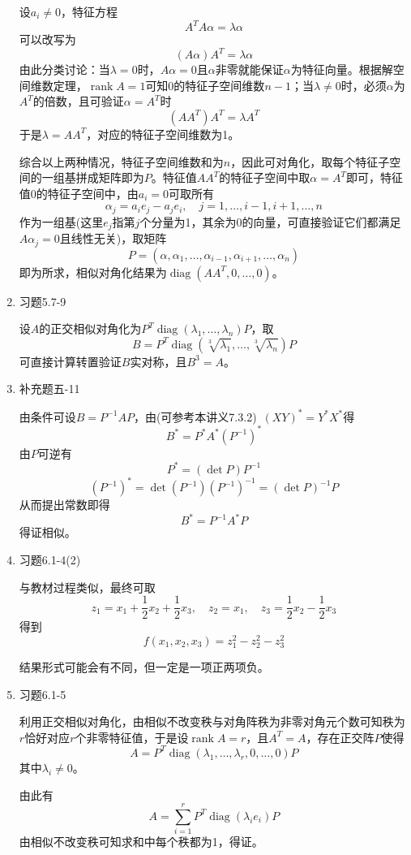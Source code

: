 \documentclass[a4paper,UTF8,fontset=windows]{ctexart}
\DeclareMathOperator{\diag}{diag}
\DeclareMathOperator{\rank}{rank}
\newcommand*{\note}{\noindent *}
\begin{document}
\begin{enumerate}
    设$a_i\ne0$，特征方程
    $$A^TA\alpha=\lambda\alpha$$
    可以改写为
    $$(A\alpha)A^T=\lambda\alpha$$
    由此分类讨论：当$\lambda=0$时，$A\alpha=0$且$\alpha$非零就能保证$\alpha$为特征向量。根据解空间维数定理，$\rank A=1$可知0的特征子空间维数$n-1$；当$\lambda\ne0$时，必须$\alpha$为$A^T$的倍数，且可验证$\alpha=A^T$时
    $$(AA^T)A^T=\lambda A^T$$
    于是$\lambda=AA^T$，对应的特征子空间维数为1。

    综合以上两种情况，特征子空间维数和为$n$，因此可对角化，取每个特征子空间的一组基拼成矩阵即为$P$。特征值$AA^T$的特征子空间中取$\alpha=A^T$即可，特征值0的特征子空间中，由$a_i=0$可取所有
    $$\alpha_j=a_ie_j-a_je_i,\quad j=1,\dots,i-1,i+1,\dots,n$$
    作为一组基(这里$e_j$指第$j$个分量为1，其余为0的向量，可直接验证它们都满足$A\alpha_j=0$且线性无关)，取矩阵
    $$P=(\alpha,\alpha_1,\dots,\alpha_{i-1},\alpha_{i+1},\dots,\alpha_n)$$
    即为所求，相似对角化结果为$\diag(AA^T,0,\dots,0)$。

    \item 习题5.7-9
    
    设$A$的正交相似对角化为$P^T\diag(\lambda_1,\dots,\lambda_n)P$，取
    $$B=P^T\diag(\sqrt[3]{\lambda_1},\dots,\sqrt[3]{\lambda_n})P$$
    可直接计算转置验证$B$实对称，且$B^3=A$。
    
    \item 补充题五-11
    
    由条件可设$B=P^{-1}AP$，由(可参考本讲义7.3.2)\ $(XY)^*=Y^*X^*$得
    $$B^*=P^*A^*(P^{-1})^*$$
    由$P$可逆有
    $$P^*=(\det P)P^{-1}$$
    $$(P^{-1})^*=\det(P^{-1})(P^{-1})^{-1}=(\det P)^{-1}P$$
    从而提出常数即得
    $$B^*=P^{-1}A^*P$$
    得证相似。
    
    \item 习题6.1-4(2)
    
    与教材过程类似，最终可取
    $$z_1=x_1+\frac{1}{2}x_2+\frac{1}{2}x_3,\quad z_2=x_1,\quad z_3=\frac{1}{2}x_2-\frac{1}{2}x_3$$
    得到
    $$f(x_1,x_2,x_3)=z_1^2-z_2^2-z_3^2$$

    \note 结果形式可能会有不同，但一定是一项正两项负。
    
    \item 习题6.1-5
    
    利用正交相似对角化，由相似不改变秩与对角阵秩为非零对角元个数可知秩为$r$恰好对应$r$个非零特征值，于是设$\rank A=r$，且$A^T=A$，存在正交阵$P$使得
    $$A=P^T\diag(\lambda_1,\dots,\lambda_r,0,\dots,0)P$$
    其中$\lambda_i\ne0$。

    由此有
    $$A=\sum_{i=1}^rP^T\diag(\lambda_ie_i)P$$
    由相似不改变秩可知求和中每个秩都为1，得证。
    

\end{enumerate}
\end{document}
